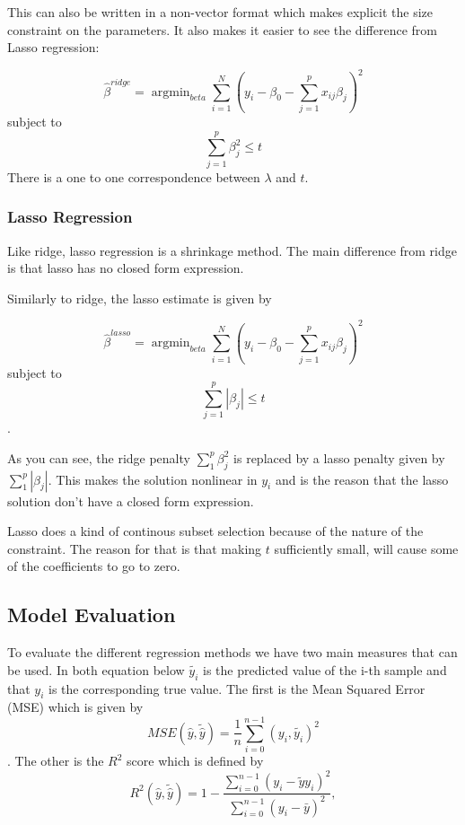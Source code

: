 This can also be written in a non-vector format which makes 
explicit the size constraint on the parameters. 
It also makes it easier to see the difference from Lasso regression:

\begin{equation}
	\hat{\beta}^{ridge} = \operatorname{argmin}_{beta} 
							\sum\limits_{i=1}^N \left(y_i - \beta_0
							-\sum\limits_{j=1}^p x_{ij}\beta_j\right)^2
\end{equation}
subject to
\begin{equation}
	\sum\limits_{j=1}^p \beta_j^2 \leq t
\end{equation}
There is a one to one correspondence between \(\lambda\) and \(t\).
\cite{IntroStatistics} 

\subsubsection{Lasso Regression}\label{seq:lasso}
Like ridge, lasso regression is a shrinkage method. The main difference from 
ridge is that lasso has no closed form expression. ~\cite{IntroStatistics} 

Similarly to ridge, the lasso estimate is given by

\begin{equation}
	\hat{\beta}^{lasso} = \operatorname{argmin}_{beta} 
							\sum\limits_{i=1}^N \left(y_i - \beta_0
							-\sum\limits_{j=1}^p x_{ij}\beta_j\right)^2
\end{equation}
subject to
\begin{equation}
	\sum\limits_{j=1}^p |\beta_j| \leq t
\end{equation}.

As you can see, the ridge penalty \(\sum_1^p \beta_j^2\) is replaced 
by a lasso penalty given by \(\sum_1^p |\beta_j|\). 
This makes the solution nonlinear in \(y_i\) and is the reason
that the lasso solution don't have a closed form expression.

Lasso does a kind of continous subset selection because of the nature of 
the constraint. The reason for that is that making \(t\) sufficiently small,
will cause some of the coefficients to go to zero. ~\cite{IntroStatistics} 

\subsection{Model Evaluation}
To evaluate the different regression methods we have two main
measures that can be used. In both equation below \(\widetilde{y_i}\) is 
the predicted value of the i-th sample and that \(y_i\) is the corresponding
true value. \cite{Project1} 
The first is the Mean Squared Error (MSE) which is given by 
\begin{equation}
	MSE(\hat{y}, \widetilde{\hat{y}}) = \frac{1}{n}\sum\limits_{i=0}^{n-1}
	(y_i, \widetilde{y_i})^2 
\end{equation}.
The other is the \(R^2\) score which is defined by
\begin{equation}
	R^2(\hat{y}, \tilde{\hat{y}}) = 1 - \frac{\sum_{i=0}^{n - 1} (y_i - \tilde{		y}	y_i)^2}{\sum_{i=0}^{n - 1} (y_i - \bar{y})^2},
\end{equation}

